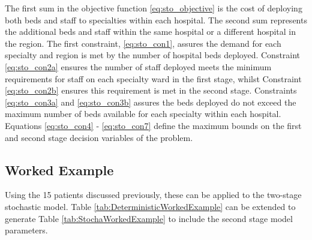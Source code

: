 \documentclass[../thesis.tex]{subfiles}
\begin{document}
The first sum in the objective function \eqref{eq:sto_objective} is the cost of deploying both beds and staff to specialties within each hospital. The second sum represents the additional beds and staff within the same hospital or a different hospital in the region. The first constraint, \eqref{eq:sto_con1}, assures the demand for each specialty and region is met by the number of hospital beds deployed. Constraint \eqref{eq:sto_con2a} ensures the number of staff deployed meets the minimum requirements for staff on each specialty ward in the first stage, whilst Constraint \eqref{eq:sto_con2b} ensures this requirement is met in the second stage. Constraints \eqref{eq:sto_con3a} and \eqref{eq:sto_con3b} assures the beds deployed do not exceed the maximum number of beds available for each specialty within each hospital. Equations \eqref{eq:sto_con4} - \eqref{eq:sto_con7} define the maximum bounds on the first and second stage decision variables of the problem.

\subsection{Worked Example}

Using the 15 patients discussed previously, these can be applied to the two-stage stochastic model. Table \ref{tab:DeterministicWorkedExample} can be extended to generate Table \ref{tab:StochaWorkedExample} to include the second stage model parameters.
\end{document}
